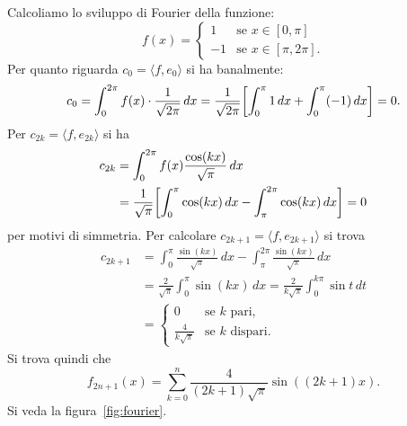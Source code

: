 \begin{example}
Calcoliamo lo sviluppo di Fourier della funzione:
\[
  f(x) = 
  \begin{cases}
    1 & \text{se $x\in [0,\pi]$}\\
    -1 & \text{se $x\in [\pi,2\pi]$}.
  \end{cases}
\]
Per quanto riguarda $c_0 = \langle f, e_0\rangle$ si ha
banalmente: 
\[
c_0 = \int_0^{2\pi} f(x) \cdot \frac{1}{\sqrt{2\pi}}\, dx 
  = \frac{1}{\sqrt{2\pi}}{\left[ \int_0^\pi 1 \, dx + \int_0^\pi (-1)\, dx \right]}
  = 0.  
\]
Per $c_{2k} = \langle f, e_{2k}\rangle$ si ha 
\begin{align*}
  c_{2k}
  &= \int_0^{2\pi} f(x)\frac{\cos (kx)}{\sqrt{\pi}}\, dx \\
  &= \frac{1}{\sqrt \pi} {\left[ \int_0^\pi \cos (kx)\, dx 
  - \int_{\pi}^{2\pi} \cos(kx)\, dx \right]}
  = 0 
\end{align*}
per motivi di simmetria.
Per calcolare $c_{2k+1}=\langle f, e_{2k+1}\rangle$ 
si trova 
\begin{align*}
  c_{2k+1}
  &= \int_0^\pi \frac{\sin(kx)}{\sqrt \pi}\, dx 
    - \int_\pi^{2\pi} \frac{\sin(kx)}{\sqrt \pi}\, dx \\
  &= \frac{2}{\sqrt \pi}\int_0^\pi \sin(kx)\, dx
  = \frac{2}{k\sqrt \pi}\int_0^{k\pi}\sin t\, dt\\
  &= 
  \begin{cases}
    0 & \text{se $k$ pari,}\\
    \frac{4}{k\sqrt \pi} & \text{se $k$ dispari.}
  \end{cases}
\end{align*}
Si trova quindi che   
\[
 f_{2n+1}(x)
 = \sum_{k=0}^n \frac{4}{(2k+1)\sqrt \pi}\sin((2k+1)x).
\]
Si veda la figura~\ref{fig:fourier}.
\end{example}

